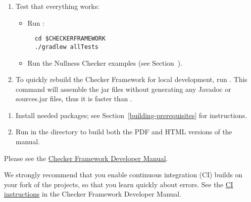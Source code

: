 \begin{enumerate}
\item Test that everything works:

  \begin{itemize}

  \item Run :
\begin{Verbatim}
  cd $CHECKERFRAMEWORK
  ./gradlew allTests
\end{Verbatim}

  \item Run the Nullness Checker examples (see
    Section~).

  \end{itemize}

\item To quickly rebuild the Checker Framework for local development,
run . This command will assemble the jar
files without generating any Javadoc or sources.jar files, thus it is
faster than .

\end{enumerate}



\begin{enumerate}
\item
Install needed packages; see Section~\ref{building-prerequisites} for
instructions.

\item
Run  in the  directory to build both the PDF and HTML versions of the manual.
\end{enumerate}



Please see the
\href{https://htmlpreview.github.io/?https://github.com/eisop/checker-framework/master/docs/developer/developer-manual.html}{Checker Framework Developer Manual}.



We strongly recommend that you enable continuous integration (CI) builds on
your fork of the projects, so that you learn quickly about errors.  See the
\href{https://htmlpreview.github.io/?https://github.com/eisop/checker-framework/master/docs/developer/developer-manual.html\#ci}{CI
  instructions} in the Checker Framework Developer Manual.


